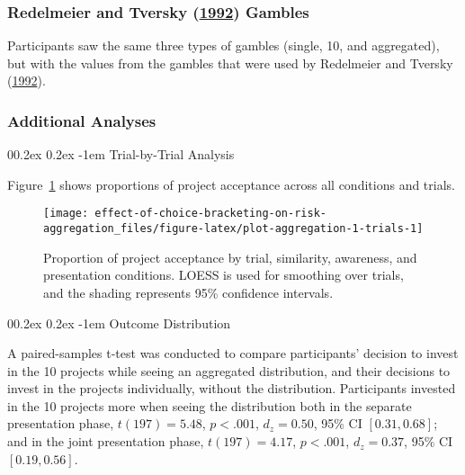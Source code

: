 \documentclass[
  english,
  man, donotrepeattitle,floatsintext]{apa7}
\makeatletter
\let\oldparagraph\paragraph
\renewcommand{\paragraph}[1]{\oldparagraph{#1}\mbox{}}
\renewcommand{\paragraph}{\@startsection{paragraph}{4}{\parindent}%
  {0\baselineskip \@plus 0.2ex \@minus 0.2ex}%
  {-1em}%
  {\normalfont\normalsize\bfseries\itshape\typesectitle}}
\theoremstyle{definition}
\theoremstyle{definition}
\theoremstyle{definition}
\theoremstyle{definition}
\theoremstyle{remark}
\makeatother
\begin{document}
\hypertarget{redelmeier1992-gambles}{%
\subsubsection{\texorpdfstring{Redelmeier and Tversky (\protect\hyperlink{ref-redelmeier1992}{1992}) Gambles}{Redelmeier and Tversky (1992) Gambles}}\label{redelmeier1992-gambles}}

Participants saw the same three types of gambles (single, 10, and aggregated),
but with the values from the gambles that were used by Redelmeier and Tversky (\protect\hyperlink{ref-redelmeier1992}{1992}).

\hypertarget{additional-analyses}{%
\subsubsection{Additional Analyses}\label{additional-analyses}}

\hypertarget{trial-by-trial-aggregation-1}{%
\paragraph{Trial-by-Trial Analysis}\label{trial-by-trial-aggregation-1}}

Figure~\ref{fig:plot-aggregation-1-trials} shows proportions of project
acceptance across all conditions and trials.



\begin{figure}
\texttt{[image: effect-of-choice-bracketing-on-risk-aggregation\_files/figure-latex/plot-aggregation-1-trials-1]} \caption{Proportion of project acceptance by trial, similarity, awareness, and presentation conditions. LOESS is used for smoothing over trials, and the shading represents 95\% confidence intervals.}\label{fig:plot-aggregation-1-trials}
\end{figure}

\hypertarget{outcome-distribution-aggregation-1}{%
\paragraph{Outcome Distribution}\label{outcome-distribution-aggregation-1}}

A paired-samples t-test was conducted to compare participants' decision to
invest in the 10 projects while seeing an aggregated distribution, and their
decisions to invest in the projects individually, without the distribution.
Participants invested in the 10 projects more when seeing the distribution both
in the separate presentation phase,
\(t(197) = 5.48\), \(p < .001\), \(d_z = 0.50\), 95\% CI \([0.31, 0.68]\); and in the joint
presentation phase, \(t(197) = 4.17\), \(p < .001\), \(d_z = 0.37\), 95\% CI \([0.19, 0.56]\).
\end{document}
